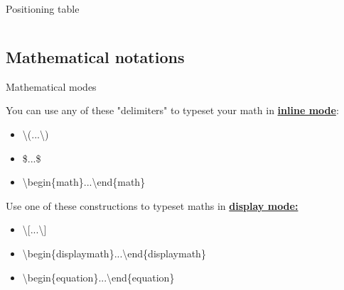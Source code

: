 \documentclass[10pt,xcolor={dvipsnames}]{beamer}
\begin{document}
\begin{frame}{Positioning table}
\begin{columns}[T]
				\end{columns}
			
		\end{frame}
	
	
	\subsection{Mathematical notations}
		\begin{frame}{Mathematical modes}
			
			You can use any of these "delimiters" to typeset your math in \textbf{\underline{inline mode}}:\\
			\begin{itemize}
				\item<3-> {\color{orange}\textbackslash(}...{\color{orange}\textbackslash)}
				\item<4-> {\color{orange}\$}...{\color{orange}\$}
				\item<5-> \textbackslash begin\{{\color{orange}math}\}...\textbackslash end\{{\color{orange}math}\}
			\end{itemize}
			
			\vspace{1cm}
			Use one of these constructions to typeset maths in \textbf{\underline{display mode:}}\\
			\begin{itemize}
				\item<7-> {\color{orange}\textbackslash[}...{\color{orange}\textbackslash]}
				\item<8-> \textbackslash begin\{{\color{orange}displaymath}\}...\textbackslash end\{{\color{orange}displaymath}\}
				\item<9-> \textbackslash begin\{{\color{orange}equation}\}...\textbackslash end\{{\color{orange}equation}\}
			\end{itemize}
		
		\end{frame}
	
\end{document}
